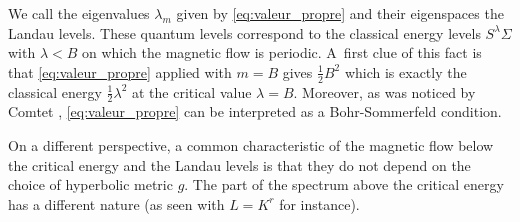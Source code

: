 \documentclass[10pt]{amsart}
\theoremstyle{plain}
\theoremstyle{definition}
\let\la\lambda
\let\Si\Sigma
\begin{document}
We call the eigenvalues $\la_m$ given by \eqref{eq:valeur_propre} and their eigenspaces the Landau levels.
These quantum levels correspond to the classical energy
levels $S^\lambda \Si$ with $\lambda <B$ on which the magnetic flow is periodic. A~first
clue of this fact is that \eqref{eq:valeur_propre} applied with $m = B$ gives $\frac{1}{2} B^2$ which is exactly the classical
energy $\frac{1}{2} \lambda^2$ at the critical value $\lambda =B$.
Moreover, as was noticed by Comtet \cite{Comtet-86}, \eqref{eq:valeur_propre} can be interpreted as a
Bohr-Sommerfeld condition.

On a different perspective, a common characteristic
of the magnetic flow below the critical energy and the Landau levels is
that they do not depend on the choice of hyperbolic metric $g$. The part of the spectrum above the
critical energy has a different nature (as seen with $L = K^r$ for instance).
\end{document}
